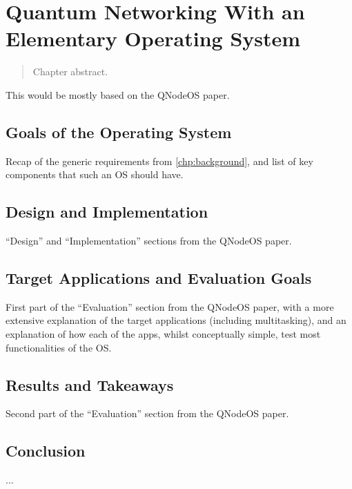 \chapter{Quantum Networking With an Elementary Operating System}
\label{chp:qnodeos}

\begin{refsection}

\begin{abstract}
Chapter abstract.
\end{abstract}


\newpage

\noindent
This would be mostly based on the QNodeOS paper.

\section{Goals of the Operating System}

Recap of the generic requirements from \cref{chp:background}, and list of key components that such
an OS should have.

\section{Design and Implementation}

``Design'' and ``Implementation'' sections from the QNodeOS paper.

\section{Target Applications and Evaluation Goals}

First part of the ``Evaluation'' section from the QNodeOS paper, with a more extensive explanation
of the target applications (including multitasking), and an explanation of how each of the apps,
whilst conceptually simple, test most functionalities of the OS.

\section{Results and Takeaways}

Second part of the ``Evaluation'' section from the QNodeOS paper.

\section{Conclusion}

...

\printbibliography[heading=subbibintoc,title={References}]

\end{refsection}

